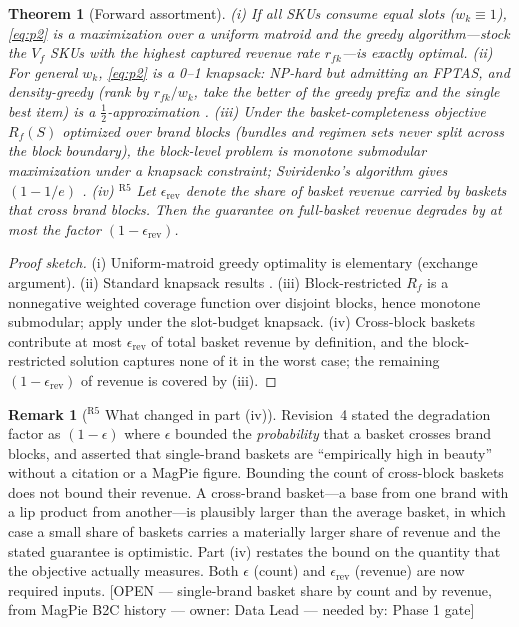 \documentclass[10pt,twocolumn,letterpaper]{article}
\newtheorem{theorem}{Theorem}
\theoremstyle{definition}
\newtheorem{remark}{Remark}
\newcommand{\OPEN}[3]{{\color{openred}\footnotesize\textsf{[OPEN --- #1 --- owner: #2 --- needed by: #3]}}}
\begin{document}
\begin{theorem}[Forward assortment]\label{thm:assortment}
\emph{(i)} If all SKUs consume equal slots ($w_k\equiv1$), \eqref{eq:p2} is a maximization over a uniform matroid and the greedy algorithm---stock the $V_f$ SKUs with the highest captured revenue rate $r_{fk}$---is exactly optimal.
\emph{(ii)} For general $w_k$, \eqref{eq:p2} is a 0--1 knapsack: NP-hard but admitting an FPTAS, and density-greedy (rank by $r_{fk}/w_k$, take the better of the greedy prefix and the single best item) is a $\tfrac12$-approximation \cite{kellerer2004}.
\emph{(iii)} Under the basket-completeness objective $R_f(S)$ optimized over brand blocks (bundles and regimen sets never split across the block boundary), the block-level problem is monotone submodular maximization under a knapsack constraint; Sviridenko's algorithm gives $(1-1/e)$ \cite{sviridenko2004}.
\emph{(iv)} $^{\mathrm{R5}}$ Let $\epsilon_{\mathrm{rev}}$ denote the \emph{share of basket revenue} carried by baskets that cross brand blocks. Then the guarantee on full-basket revenue degrades by at most the factor $(1-\epsilon_{\mathrm{rev}})$.
\end{theorem}
\begin{proof}[Proof sketch]
(i) Uniform-matroid greedy optimality is elementary (exchange argument). (ii) Standard knapsack results \cite{kellerer2004}. (iii) Block-restricted $R_f$ is a nonnegative weighted coverage function over disjoint blocks, hence monotone submodular; apply \cite{sviridenko2004} under the slot-budget knapsack. (iv) Cross-block baskets contribute at most $\epsilon_{\mathrm{rev}}$ of total basket revenue by definition, and the block-restricted solution captures none of it in the worst case; the remaining $(1-\epsilon_{\mathrm{rev}})$ of revenue is covered by (iii).
\end{proof}

\begin{remark}[$^{\mathrm{R5}}$ What changed in part (iv)]
Revision~4 stated the degradation factor as $(1-\epsilon)$ where $\epsilon$ bounded the \emph{probability} that a basket crosses brand blocks, and asserted that single-brand baskets are ``empirically high in beauty'' without a citation or a MagPie figure. Bounding the count of cross-block baskets does not bound their revenue. A cross-brand basket---a base from one brand with a lip product from another---is plausibly larger than the average basket, in which case a small share of baskets carries a materially larger share of revenue and the stated guarantee is optimistic. Part (iv) restates the bound on the quantity that the objective actually measures. Both $\epsilon$ (count) and $\epsilon_{\mathrm{rev}}$ (revenue) are now required inputs. \OPEN{single-brand basket share by count and by revenue, from MagPie B2C history}{Data Lead}{Phase 1 gate}
\end{remark}
\end{document}
